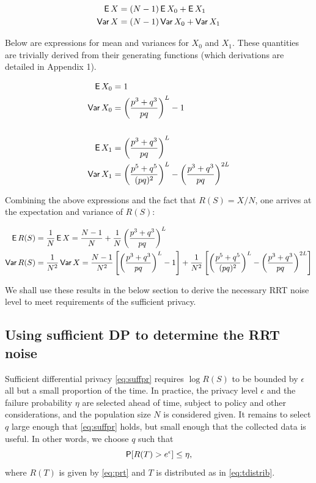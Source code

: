 \documentclass[11pt]{article}
\begin{document}
\begin{align*}
 \EP X &= (N-1)\EP X_0 + \EP X_1 \\
 \Var X &= (N-1)\Var X_0 + \Var X_1
\end{align*}

Below are expressions for mean and variances for $X_0$ and $X_1$.  These quantities are trivially derived from their generating functions (which derivations are detailed in Appendix 1).

\begin{align*}
\EP X_0 &= 1 \\
\Var X_0 &= \left ( \frac{p^3 + q^3}{pq} \right )^L - 1 \\
\\
\EP X_1 &=  \left ( \frac{p^3 + q^3}{pq} \right )^L\\
\Var X_1 &= \left ( \frac{p^5 + q^5}{(pq)^2} \right )^{L}  - \left ( \frac{p^3 + q^3}{pq} \right )^{2L} 
\end{align*}

Combining the above expressions and the fact that $R(S) = X / N$, one arrives at the expectation and variance of $R(S)$:

\begin{align*}
\EP R(S) &=  \frac{1}{N}\EP X  = \frac{N-1}{N} + \frac{1}{N} \left ( \frac{p^3 + q^3}{pq} \right )^{L}  \\  
\Var R(S) &= \frac{1}{N^2}\Var X = \frac{N-1}{N^2} \left [  \left ( \frac{p^3 + q^3}{pq} \right )^L - 1 \right ]  +  \frac{1}{N^2} \left [ \left ( \frac{p^5 + q^5}{(pq)^2} \right )^{L}  - \left ( \frac{p^3 + q^3}{pq} \right )^{2L} \right ]
\end{align*}

We shall use these results in the below section to derive the necessary RRT noise level to meet requirements of the sufficient privacy.

\subsection{Using sufficient DP to determine the RRT noise}

Sufficient differential privacy \eqref{eq:suffpr} requires $\log R(S)$ to be bounded by $\epsilon$ all but a small proportion of the time.
In practice, the privacy level $\epsilon$ and the failure probability $\eta$ are selected ahead of time, subject to policy and other considerations, and the population size $N$ is considered given.
It remains to select $q$ large enough that \eqref{eq:suffpr} holds, but small enough that the collected data is useful.
In other words, we choose $q$ such that
\begin{equation*}
\P[R(T) > e^\epsilon] \leq \eta,
\end{equation*}
where $R(T)$ is given by \eqref{eq:prt} and $T$ is distributed as in \eqref{eq:tdistrib}.
\end{document}
